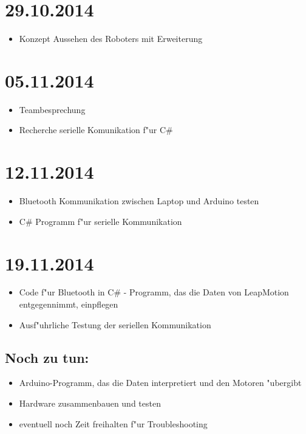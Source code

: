 \documentclass[11pt,a4paper]{article}
\begin{document}
\section*{29.10.2014}

\begin{itemize}
\item Konzept Aussehen des Roboters mit Erweiterung
\end{itemize}


\section*{05.11.2014}

\begin{itemize}
\item Teambesprechung
\item Recherche serielle Komunikation f"ur C\#
\end{itemize}


\section*{12.11.2014}

\begin{itemize}
\item Bluetooth Kommunikation zwischen Laptop und Arduino testen
\item C\# Programm f"ur serielle Kommunikation
\end{itemize}


\section*{19.11.2014}

\begin{itemize}
\item Code f"ur Bluetooth in C\# - Programm, das die Daten von LeapMotion entgegennimmt, einpflegen
\item Ausf"uhrliche Testung der seriellen Kommunikation
\end{itemize}

\subsection*{Noch zu tun:}
\begin{itemize}
\item Arduino-Programm, das die Daten interpretiert und den Motoren "ubergibt
\item Hardware zusammenbauen und testen
\item eventuell noch Zeit freihalten f"ur Troubleshooting
\end{itemize}
\end{document}
